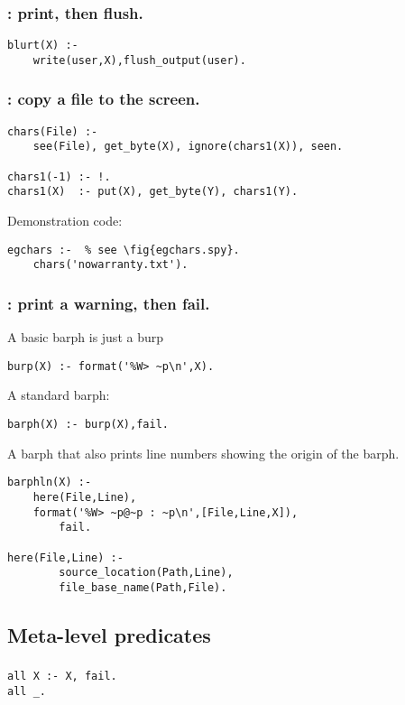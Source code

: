 \subsubsection{ : print, then flush.
}
\begin{Verbatim}
blurt(X) :- 
    write(user,X),flush_output(user).
\end{Verbatim}
\subsubsection{ : copy a file to the screen.
}
\label{sec:chars/1}
\begin{Verbatim}
chars(File) :- 
    see(File), get_byte(X), ignore(chars1(X)), seen.
    
chars1(-1) :- !.
chars1(X)  :- put(X), get_byte(Y), chars1(Y).
\end{Verbatim}
Demonstration code:
\begin{Verbatim}
egchars :-  % see \fig{egchars.spy}.
    chars('nowarranty.txt').
\end{Verbatim}
\subsubsection{ : print a warning, then fail.
}
A basic barph is just a burp
\begin{Verbatim}
burp(X) :- format('%W> ~p\n',X).
\end{Verbatim}
A standard barph:
\begin{Verbatim}
barph(X) :- burp(X),fail.
\end{Verbatim}
 A barph that also prints line numbers showing
 the origin of the barph. 
\begin{Verbatim}
barphln(X) :-
    here(File,Line),
    format('%W> ~p@~p : ~p\n',[File,Line,X]),
        fail. 

here(File,Line) :-
        source_location(Path,Line),
        file_base_name(Path,File).
\end{Verbatim}        
\subsection{ Meta-level predicates
}
\subsubsection{
}
\begin{Verbatim}
all X :- X, fail.
all _.
\end{Verbatim}
